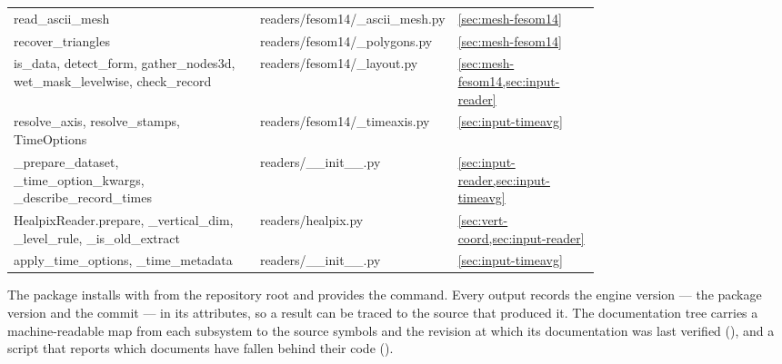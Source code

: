 \begin{longtable}{@{}>{\ttfamily\footnotesize\raggedright\arraybackslash}p{0.42\linewidth} >{\ttfamily\footnotesize\raggedright\arraybackslash}p{0.33\linewidth} >{\footnotesize}l@{}}
read\_ascii\_mesh & readers/fesom14/\_ascii\_mesh.py & \cref{sec:mesh-fesom14} \\
recover\_triangles & readers/fesom14/\_polygons.py & \cref{sec:mesh-fesom14} \\
is\_data, detect\_form, gather\_nodes3d, wet\_mask\_levelwise, check\_record & readers/fesom14/\_layout.py & \cref{sec:mesh-fesom14,sec:input-reader} \\
resolve\_axis, resolve\_stamps, TimeOptions & readers/fesom14/\_timeaxis.py & \cref{sec:input-timeavg} \\
\_prepare\_dataset, \_time\_option\_kwargs, \_describe\_record\_times & readers/\_\_init\_\_.py & \cref{sec:input-reader,sec:input-timeavg} \\
HealpixReader.prepare, \_vertical\_dim, \_level\_rule, \_is\_old\_extract & readers/healpix.py & \cref{sec:vert-coord,sec:input-reader} \\
apply\_time\_options, \_time\_metadata & readers/\_\_init\_\_.py & \cref{sec:input-timeavg} \\
\bottomrule
\end{longtable}

\noindent The package installs with  from the repository root and provides the
 command. Every output records the engine version --- the package version and the commit ---
in its attributes, so a result can be traced to the source that produced it. The documentation tree carries a
machine-readable map from each subsystem to the source symbols and the revision at which its documentation was
last verified (), and a script that reports which documents have fallen behind their
code ().
